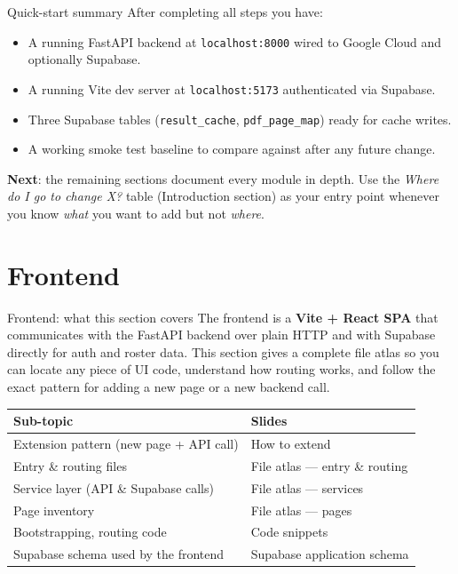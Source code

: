 \documentclass[aspectratio=169]{beamer}
\begin{document}
\begin{frame}{Quick-start summary}
  \small
  After completing all steps you have:
  \begin{itemize}\setlength\itemsep{0.25em}
    \item A running FastAPI backend at \texttt{localhost:8000} wired to Google Cloud and optionally Supabase.
    \item A running Vite dev server at \texttt{localhost:5173} authenticated via Supabase.
    \item Three Supabase tables (\texttt{result\_cache}, \texttt{pdf\_page\_map}) ready for cache writes.
    \item A working smoke test baseline to compare against after any future change.
  \end{itemize}
  \vspace{0.4em}
  \textbf{Next}: the remaining sections document every module in depth.
  Use the \textit{Where do I go to change X?} table (Introduction section) as your entry point
  whenever you know \emph{what} you want to add but not \emph{where}.
\end{frame}

\section{Frontend}

\begin{frame}{Frontend: what this section covers}
  \small
  The frontend is a \textbf{Vite + React SPA} that communicates with the FastAPI backend
  over plain HTTP and with Supabase directly for auth and roster data.
  This section gives a complete file atlas so you can locate any piece of UI code,
  understand how routing works, and follow the exact pattern for adding a new page
  or a new backend call.\\[0.4em]
  \begin{tabular}{@{}ll@{}}
    \toprule
    Sub-topic & Slides \\
    \midrule
    Extension pattern (new page + API call) & How to extend \\
    Entry \& routing files & File atlas --- entry \& routing \\
    Service layer (API \& Supabase calls) & File atlas --- services \\
    Page inventory & File atlas --- pages \\
    Bootstrapping, routing code & Code snippets \\
    Supabase schema used by the frontend & Supabase application schema \\
    \bottomrule
  \end{tabular}
\end{frame}
\end{document}
